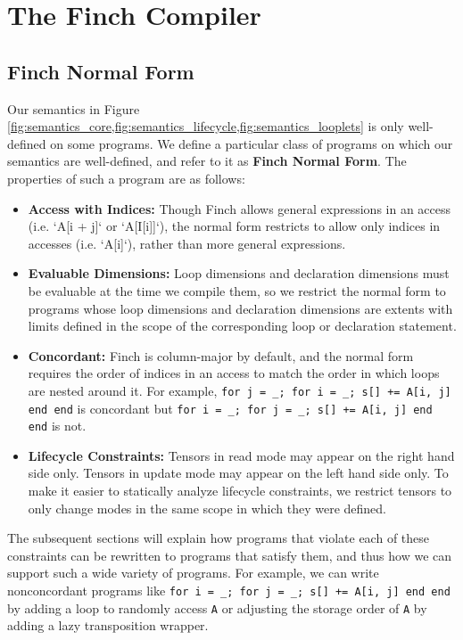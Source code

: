 \section{The Finch Compiler}

\subsection{Finch Normal Form}

Our semantics in Figure
\ref{fig:semantics_core,fig:semantics_lifecycle,fig:semantics_looplets} is only
well-defined on some programs. We define a particular class of programs on which
our semantics are well-defined, and refer to it as \textbf{Finch Normal Form}.
The properties of such a program are as follows:
\begin{itemize}
    \item \textbf{Access with Indices:} Though Finch allows general expressions in an
    access (i.e. `A[i + j]` or `A[I[i]]`), the normal form restricts to allow only indices in 
    accesses (i.e. `A[i]`), rather than more general expressions.
    \item \textbf{Evaluable Dimensions:} Loop dimensions and declaration dimensions must
    be evaluable at the time we compile them, so we restrict the normal form to
    programs whose loop dimensions and declaration dimensions are extents with
    limits defined in the scope of the corresponding loop or declaration
    statement.
    \item \textbf{Concordant:} Finch is column-major by default, and the normal form
    requires the order of indices in an access to match the order in which loops
    are nested around it.  For example,
    \texttt{for j = _; for i = _; s[] += A[i, j] end end}
    is concordant but
    \texttt{for i = _; for j = _; s[] += A[i, j] end end} is not.
    \item \textbf{Lifecycle Constraints:} Tensors in read mode may appear on the right
    hand side only. Tensors in update mode may appear on the left hand side
    only. To make it easier to statically analyze lifecycle constraints, we
    restrict tensors to only change modes in the same scope in which they were
    defined.
\end{itemize}

The subsequent sections will explain how programs that violate each of these
constraints can be rewritten to programs that satisfy them, and thus how we can
support such a wide variety of programs. For example, we can write nonconcordant
programs like  \texttt{for i = _; for j = _; s[] += A[i, j] end end}
by adding a loop to randomly access \texttt{A} or adjusting the
storage order of \texttt{A} by adding a lazy transposition wrapper.

